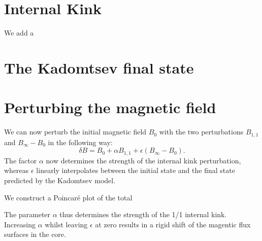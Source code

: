 \documentclass[%
superscriptaddress,
amsmath,amssymb,
aps,
pre,
floatfix,
]{revtex4-2}
\begin{document}
\section*{Internal Kink}
We add a

\section*{The Kadomtsev final state}

\section{Perturbing the magnetic field}
We can now perturb the initial magnetic field $B_0$ with the two perturbations $B_{1,1}$ and $B_\infty -B_0$ in the following way: 
\begin{equation}\label{eq:totalfield}
    \delta B =  B_0 + \alpha B_{1,1}+ \epsilon (B_\infty -B_0). 
\end{equation}
The factor $\alpha$ now determines the strength of the internal kink perturbation, whereas $\epsilon$ linearly interpolates between the initial state and the final state predicted by the Kadomtsev model. 

We construct a Poincar\'e plot of the total 

The parameter $\alpha$ thus determines the strength of the 1/1 internal kink.
Increasing $\alpha$ whilst leaving $\epsilon$ at zero results in a rigid shift of the magentic flux surfaces in the core. 




\end{document}
